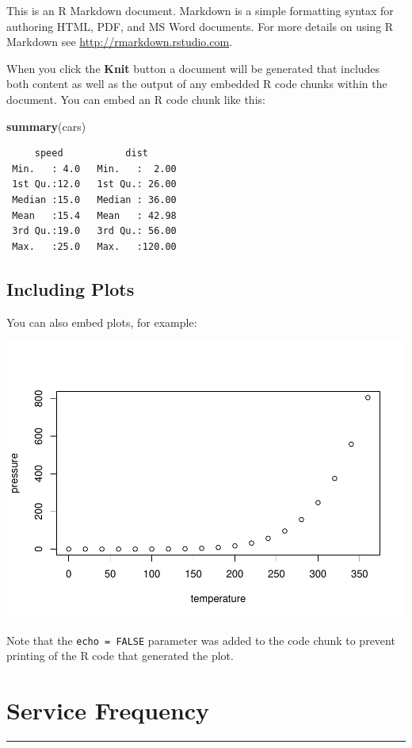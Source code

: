\documentclass[
11pt, %
oneside, %
english, %
singlespacing, %
]{macthesis} %
\newenvironment{Shaded}{\begin{snugshade}}{\end{snugshade}}
\newcommand{\FunctionTok}[1]{\textcolor[rgb]{0.13,0.29,0.53}{\textbf{#1}}}
\newcommand{\NormalTok}[1]{#1}
\begin{document}
This is an R Markdown document. Markdown is a simple formatting syntax for authoring HTML, PDF, and MS Word documents. For more details on using R Markdown see \url{http://rmarkdown.rstudio.com}.

When you click the \textbf{Knit} button a document will be generated that includes both content as well as the output of any embedded R code chunks within the document. You can embed an R code chunk like this:
\begin{Shaded}
\begin{Highlighting}[]
\FunctionTok{summary}\NormalTok{(cars)}
\end{Highlighting}
\end{Shaded}
\begin{verbatim}
     speed           dist       
 Min.   : 4.0   Min.   :  2.00  
 1st Qu.:12.0   1st Qu.: 26.00  
 Median :15.0   Median : 36.00  
 Mean   :15.4   Mean   : 42.98  
 3rd Qu.:19.0   3rd Qu.: 56.00  
 Max.   :25.0   Max.   :120.00  
\end{verbatim}
\hypertarget{including-plots}{%
\section{Including Plots}\label{including-plots}}

You can also embed plots, for example:

\includegraphics{thesis_files/figure-latex/pressure-1.pdf}

Note that the \texttt{echo\ =\ FALSE} parameter was added to the code chunk to prevent printing of the R code that generated the plot.

\hypertarget{service-frequency}{%
\chapter{Service Frequency}\label{service-frequency}}
\begin{center}\rule{0.5\linewidth}{0.5pt}\end{center}
\end{document}
